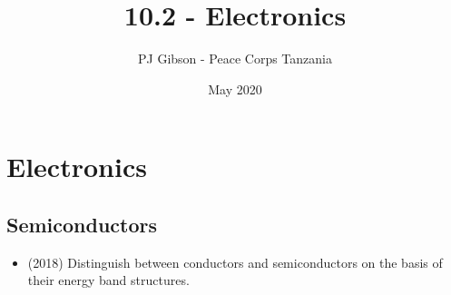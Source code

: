 \documentclass{article}
\title{10.2 - Electronics}
\author{PJ Gibson - Peace Corps Tanzania}
\date{May 2020}
\begin{document}
\maketitle


\section{Electronics}

\subsection{Semiconductors}
\begin{itemize}
\item (2018)  Distinguish between conductors and semiconductors on the basis of their energy band structures. 
\end{itemize}
\end{document}
